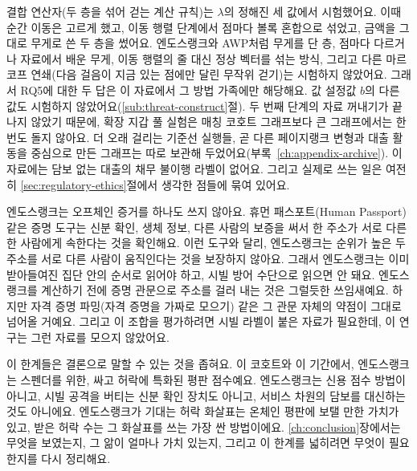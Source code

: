 결합 연산자(두 층을 섞어 걷는 계산 규칙)는 $\lambda$의 정해진 세 값에서 시험했어요. 이때 순간 이동은 고르게 했고, 이동 행렬 단계에서 점마다 볼록 혼합으로 섞었고, 금액을 그대로 무게로 쓴 두 층을 썼어요. 엔도스랭크와 AWP처럼 무게를 단 층, 점마다 다르거나 자료에서 배운 무게, 이동 행렬의 줄 대신 정상 벡터를 섞는 방식, 그리고 다른 마르코프 연쇄(다음 걸음이 지금 있는 점에만 달린 무작위 걷기)는 시험하지 않았어요. 그래서 RQ5에 대한 두 답은 이 자료에서 그 방법 가족에만 해당해요. 값 설정값 $b$의 다른 값도 시험하지 않았어요(\ref{sub:threat-construct}절). 두 번째 단계의 자료 꺼내기가 끝나지 않았기 때문에, 확장 지갑 풀 실험은 매칭 코호트 그래프보다 큰 그래프에서는 한 번도 돌지 않아요. 더 오래 걸리는 기준선 실행들, 곧 다른 페이지랭크 변형과 대출 활동을 중심으로 만든 그래프는 따로 보관해 두었어요(부록~\ref{ch:appendix-archive}). 이 자료에는 담보 없는 대출의 채무 불이행 라벨이 없어요. 그리고 실제로 쓰는 일은 여전히 \ref{sec:regulatory-ethics}절에서 생각한 점들에 묶여 있어요.

엔도스랭크는 오프체인 증거를 하나도 쓰지 않아요. 휴먼 패스포트(Human Passport) 같은 증명 도구는 신분 확인, 생체 정보, 다른 사람의 보증을 써서 한 주소가 서로 다른 한 사람에게 속한다는 것을 확인해요. 이런 도구와 달리, 엔도스랭크는 순위가 높은 두 주소를 서로 다른 사람이 움직인다는 것을 보장하지 않아요. 그래서 엔도스랭크는 이미 받아들여진 집단 안의 순서로 읽어야 하고, 시빌 방어 수단으로 읽으면 안 돼요. 엔도스랭크를 계산하기 전에 증명 관문으로 주소를 걸러 내는 것은 그럴듯한 쓰임새예요. 하지만 자격 증명 파밍(자격 증명을 가짜로 모으기) 같은 그 관문 자체의 약점이 그대로 넘어올 거예요. 그리고 이 조합을 평가하려면 시빌 라벨이 붙은 자료가 필요한데, 이 연구는 그런 자료를 모으지 않았어요.

이 한계들은 결론으로 말할 수 있는 것을 좁혀요. 이 코호트와 이 기간에서, 엔도스랭크는 스펜더를 위한, 싸고 허락에 특화된 평판 점수예요. 엔도스랭크는 신용 점수 방법이 아니고, 시빌 공격을 버티는 신분 확인 장치도 아니고, 서비스 차원의 담보를 대신하는 것도 아니에요. 엔도스랭크가 기대는 허락 화살표는 온체인 평판에 보탤 만한 가치가 있고, 받은 허락 수는 그 화살표를 쓰는 가장 싼 방법이에요. \ref{ch:conclusion}장에서는 무엇을 보였는지, 그 앎이 얼마나 가치 있는지, 그리고 이 한계를 넓히려면 무엇이 필요한지를 다시 정리해요.
